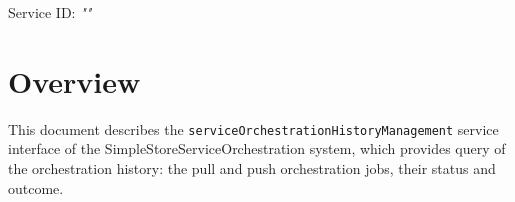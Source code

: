 \documentclass[a4paper]{arrowhead}
\begin{document}
\sloppy

\ArrowheadSetup

\begin{center}
  \vspace*{1cm}
  \huge{\arrowtitle}

  \vspace*{0.2cm}
  \LARGE{\arrowtype}
  \vspace*{1cm}

  \Large{Service ID: \textit{"\arrowid"}}

  \vspace*{\fill}


  \vspace*{1cm}
  \vspace*{\fill}

  \begin{abstract}
    This document describes the HTTP/1.1 protocol with TLS payload security and JSON payload encoding variant of the \texttt{service\allowbreak{}Orchestration\allowbreak{}History\allowbreak{}Management} service of the SimpleStoreServiceOrchestration system.
  \end{abstract}

  \vspace*{1cm}
\end{center}

\newpage

\tableofcontents
\newpage

\section{Overview}
\label{sec:overview}

This document describes the \texttt{service\allowbreak{}Orchestration\allowbreak{}History\allowbreak{}Management} service interface of the SimpleStoreServiceOrchestration system, which provides query of the orchestration history: the pull and push orchestration jobs, their status and outcome.
\end{document}
